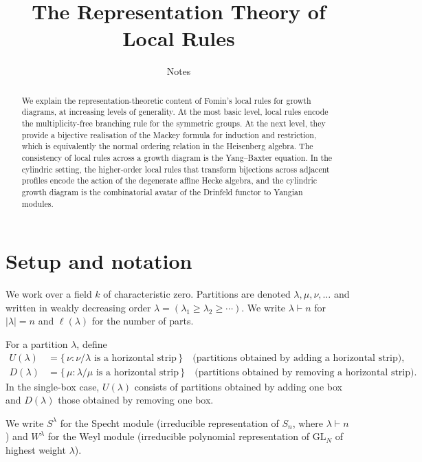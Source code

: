 \documentclass[12pt,a4paper]{article}
\title{The Representation Theory of Local Rules}
\author{Notes}
\date{}
\theoremstyle{definition}
\theoremstyle{remark}
\begin{document}
\maketitle

\begin{abstract}
We explain the representation-theoretic content of Fomin's local rules
for growth diagrams, at increasing levels of generality. At the most
basic level, local rules encode the multiplicity-free branching rule
for the symmetric groups. At the next level, they provide a bijective
realisation of the Mackey formula for induction and restriction, which
is equivalently the normal ordering relation in the Heisenberg
algebra. The consistency of local rules across a growth diagram is the
Yang--Baxter equation. In the cylindric setting, the higher-order
local rules that transform bijections across adjacent profiles encode
the action of the degenerate affine Hecke algebra, and the cylindric
growth diagram is the combinatorial avatar of the Drinfeld functor to
Yangian modules.
\end{abstract}

\tableofcontents

\section{Setup and notation}
\label{sec:setup}

We work over a field $k$ of characteristic zero. Partitions are
denoted $\lambda, \mu, \nu, \ldots$ and written in weakly decreasing
order $\lambda = (\lambda_1 \geqslant \lambda_2 \geqslant \cdots)$.
We write $\lambda \vdash n$ for $|\lambda| = n$ and
$\ell(\lambda)$ for the number of parts.

For a partition $\lambda$, define
\begin{align*}
  U(\lambda) &= \{\,\nu : \nu/\lambda \text{ is a horizontal strip}\,\}
    \quad \text{(partitions obtained by adding a horizontal strip)}, \\
  D(\lambda) &= \{\,\mu : \lambda/\mu \text{ is a horizontal strip}\,\}
    \quad \text{(partitions obtained by removing a horizontal strip)}.
\end{align*}
In the single-box case, $U(\lambda)$ consists of partitions obtained
by adding one box and $D(\lambda)$ those obtained by removing one box.

We write $S^\lambda$ for the Specht module (irreducible representation
of $S_n$, where $\lambda \vdash n$) and $W^\lambda$ for the Weyl
module (irreducible polynomial representation of $\mathrm{GL}_N$ of
highest weight $\lambda$).
\end{document}
